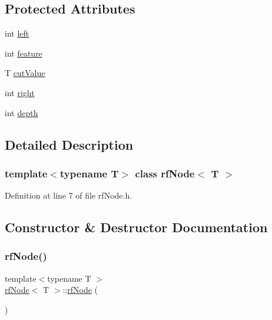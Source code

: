 \subsection*{Protected Attributes}
\begin{DoxyCompactItemize}
\item 
int \hyperlink{classrfNode_ac8e195fc3d8a9647f10a42153d76119f}{left}
\item 
int \hyperlink{classrfNode_ac8c0dd14a4e53f9b831f326f5d197e0e}{feature}
\item 
T \hyperlink{classrfNode_a49b9c55f11f1f3898eb7811f78f68796}{cut\+Value}
\item 
int \hyperlink{classrfNode_a01e57d43ac8af60d16880544e99ed965}{right}
\item 
int \hyperlink{classrfNode_a7cb8fb854d8ec90635bd7207d8b8c31e}{depth}
\end{DoxyCompactItemize}


\subsection{Detailed Description}
\subsubsection*{template$<$typename T$>$\newline
class rf\+Node$<$ T $>$}



Definition at line 7 of file rf\+Node.\+h.



\subsection{Constructor \& Destructor Documentation}
\mbox{\label{classrfNode_afdc668c17dc9190635c088b54f251732}} 
\subsubsection{\texorpdfstring{rf\+Node()}{rfNode()}\hspace{0.1cm}{\footnotesize\ttfamily [1/2]}}
{\footnotesize\ttfamily template$<$typename T $>$ \\
\hyperlink{classrfNode}{rf\+Node}$<$ T $>$\+::\hyperlink{classrfNode}{rf\+Node} (\begin{DoxyParamCaption}{ }\end{DoxyParamCaption})\hspace{0.3cm}{\ttfamily [inline]}}



